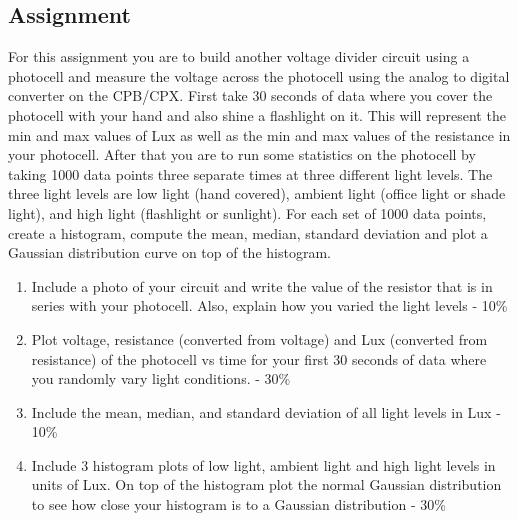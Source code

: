 \subsection{Assignment}

For this assignment you are to build another voltage divider circuit using a photocell and measure the voltage across the photocell using the analog to digital converter on the CPB/CPX. First take 30 seconds of data where you cover the photocell with your hand and also shine a flashlight on it. This will represent the min and max values of Lux as well as the min and max values of the resistance in your photocell. After that you are to run some statistics on the photocell by taking 1000 data points three separate times at three different light levels. The three light levels are low light (hand covered), ambient light (office light or shade light), and high light (flashlight or sunlight). For each set of 1000 data points, create a histogram, compute the mean, median, standard deviation and plot a Gaussian distribution curve on top of the histogram. 


        
\begin{enumerate}[itemsep=-5pt]
\item Include a photo of your circuit and write the value of the resistor that is in series with your photocell. Also, explain how you varied the light levels - 10\%
\item Plot voltage, resistance (converted from voltage) and Lux (converted from resistance) of the photocell vs time for your first 30 seconds of data where you randomly vary light conditions. - 30\%
\item Include the mean, median, and standard deviation of all light levels in Lux - 10\%
\item Include 3 histogram plots of low light, ambient light and high
light levels in units of Lux. On top of the histogram plot the normal Gaussian distribution to see how close your histogram is to a Gaussian distribution - 30\%
\end{enumerate}
